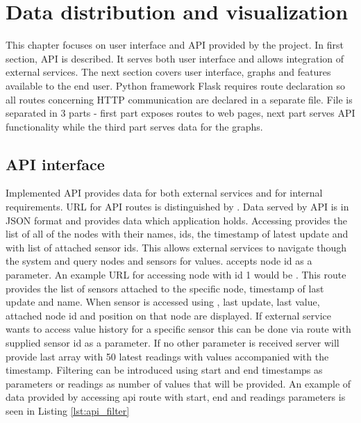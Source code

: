 \chapter{Data distribution and visualization}
\label{chap:display}

This chapter focuses on user interface and \ac{API} provided by the project. In first section, \ac{API} is described. It serves both user interface and allows integration of external services. The next section covers user interface, graphs and features available to the end user. Python framework Flask requires route declaration so all routes concerning \ac{HTTP} communication are declared in a separate file. File is separated in 3 parts - first part exposes routes to web pages, next part serves \ac{API} functionality while the third part serves data for the graphs.


\section{API interface}

Implemented \ac{API} provides data for both external services and for internal requirements. \ac{URL} for \ac{API} routes is distinguished by . Data served by \ac{API} is in \ac{JSON} format and provides data which application holds. Accessing  provides the list of all of the nodes with their names, \ac{id}s, the timestamp of latest update and with list of attached sensor \ac{id}s. This allows external services to navigate though the system and query nodes and sensors for values.  accepts node \ac{id} as a parameter. An example \ac{URL} for accessing node with id 1 would be . This route provides the list of sensors attached to the specific node, timestamp of last update and name. When sensor is accessed using , last update, last value, attached node id and position on that node are displayed. If external service wants to access value history for a specific sensor this can be done via route  with supplied sensor id as a parameter. If no other parameter is received server will provide last array with 50 latest readings with values accompanied with the timestamp. Filtering can be introduced using start and end timestamps as parameters or readings as number of values that will be provided. An example of data provided by accessing api route with start, end and readings parameters is seen in Listing \ref{lst:api_filter} \\

